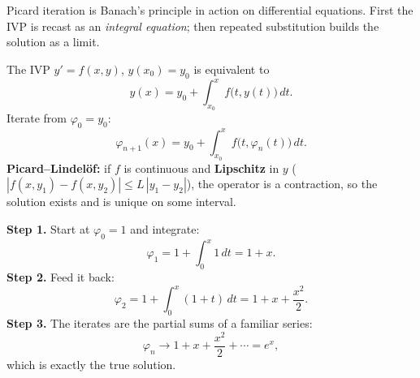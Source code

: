 Picard iteration is Banach's principle in action on differential equations.
First the IVP is recast as an \emph{integral equation}; then repeated
substitution builds the solution as a limit.

\begin{formulabox}
The IVP $y' = f(x,y)$, $y(x_0)=y_0$ is equivalent to
\[ y(x) = y_0 + \int_{x_0}^{x} f\big(t, y(t)\big)\,dt. \]
Iterate from $\varphi_0 = y_0$:
\[ \varphi_{n+1}(x) = y_0 + \int_{x_0}^{x} f\big(t, \varphi_n(t)\big)\,dt. \]
\textbf{Picard--Lindel\"of:} if $f$ is continuous and \textbf{Lipschitz} in $y$
($|f(x,y_1)-f(x,y_2)| \le L\,|y_1-y_2|$), the operator is a contraction, so the
solution exists and is unique on some interval.
\end{formulabox}

\begin{examplebox}[Worked Example 3.6: Picard iterates for $y'=y,\ y(0)=1$]
\textbf{Step 1.} Start at $\varphi_0 = 1$ and integrate:
\[ \varphi_1 = 1 + \int_0^x 1\,dt = 1 + x. \]
\textbf{Step 2.} Feed it back:
\[ \varphi_2 = 1 + \int_0^x (1+t)\,dt = 1 + x + \frac{x^2}{2}. \]
\textbf{Step 3.} The iterates are the partial sums of a familiar series:
\[ \varphi_n \to 1 + x + \frac{x^2}{2} + \cdots = e^{x}, \]
which is exactly the true solution.
\end{examplebox}


